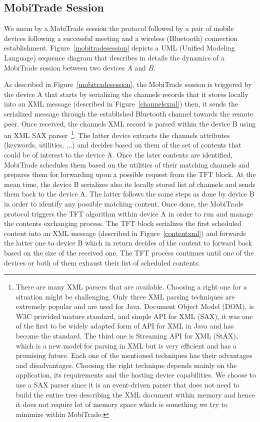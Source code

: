 \subsection{MobiTrade Session}
\label{MobiTrade-session}

We mean by a MobiTrade session the protocol followed by a pair of mobile devices following a successful meeting and a wireless (Bluetooth) connection establishment. Figure~\ref{mobitradesession} depicts a UML (Unified Modeling Language) sequence diagram that describes in details the dynamics of a MobiTrade session between two devices $A$ and $B$. 

As described in Figure~\ref{mobitradesession}, the MobiTrade session is triggered by the device A that starts by serializing the channels records that it stores locally into an XML message (described in Figure~\ref{channelsxml}) then, it sends the serialized message through the established Bluetooth channel towards the remote peer. Once received, the channels XML record is parsed within the device B using an XML SAX parser~\footnote{There are many XML parsers that are available. Choosing a right one for a situation might be challenging. Only three XML parsing techniques are extremely popular and are used for Java. Document Object Model (DOM), is W3C provided mature standard, and simple API for XML (SAX), it was one of the first to be widely adapted form of API for XML in Java and has become the standard. The third one is Streaming API for XML (StAX), which is a new model for parsing in XML but is very efficient and has a promising future. Each one of the mentioned techniques has their advantages and disadvantages. Choosing the right technique depends mainly on the application, its requirements and the hosting device capabilities. We choose to use a SAX parser since it is an event-driven parser that does not need to build the entire tree describing the XML document within memory and hence it does not require lot of memory space which is something we try to minimize within MobiTrade.}. The latter device extracts the channels attributes (keywords, utilities, ...) and decides based on them of the set of contents that could be of interest to the device A. Once the later contents are identified, MobiTrade schedules them based on the utilities of their matching channels and prepares them for forwarding upon a possible request from the TFT block. At the mean time, the device B serializes also its locally stored list of channels and sends them back to the device A. The latter follows the same steps as done by device B in order to identify any possible matching content. Once done, the MobiTrade protocol triggers the TFT algorithm within device A in order to run and manage the contents exchanging process. The TFT block serializes the first scheduled content into an XML message (described in Figure~\ref{contentxml}) and forwards the latter one to device B which in return decides of the content to forward back based on the size of the received one. The TFT process continues until one of the devices or both of them exhaust their list of scheduled contents. 


